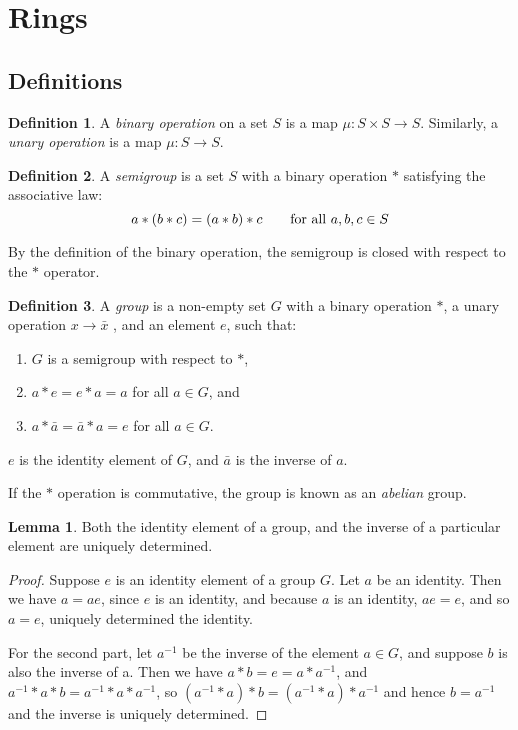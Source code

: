 \documentclass{article}
\theoremstyle{definition}
\newtheorem{definition}{Definition}[section]
\newtheorem{lemma}[theorem]{Lemma}
\begin{document}
\section{Rings}

\subsection{Definitions}

  \begin{definition}
    A \emph{binary operation} on a set $S$ is a map $\mu:S \times S \to S$.
    Similarly, a \emph{unary operation} is a map $\mu:S \to S$.
  \end{definition}

  \begin{definition}
    A \emph{semigroup} is a set $S$ with a binary operation $*$ satisfying
    the associative law:
    \[
      a * (b * c) = (a * b) * c \text{\qquad for all } a, b,c \in S
    \]

    By the definition of the binary operation, the semigroup is closed with
    respect to the $*$ operator.

  \end{definition}

  \begin{definition} A \emph{group} is a non-empty set $G$ with a binary
    operation $*$, a unary operation $x \to \bar{x}$ ,
    and an element $e$, such that:

    \begin{enumerate}
      \item $G$ is a semigroup with respect to $*$,
      \item $a * e = e * a = a$ for all $a \in G$, and
      \item $a * \bar{a} = \bar{a} * a = e$ for all $a \in G$.
    \end{enumerate}

    $e$ is the identity element of $G$, and $\bar{a}$ is the inverse of $a$.

    If the $*$ operation is commutative, the group is known as an
    \emph{abelian} group.

  \end{definition}

  \begin{lemma}
    Both the identity element of a group, and the inverse of a particular
    element are uniquely determined.
  \end{lemma}

  \begin{proof}
    Suppose $e$ is an identity element of a group $G$. Let $a$ be an identity.
    Then we have $a = ae$, since $e$ is an identity, and because $a$ is an
    identity, $ae = e$, and so $a = e$, uniquely determined the identity.

    For the second part, let $a^{-1}$ be the inverse of the element $a \in G$,
    and suppose $b$ is also the inverse of a. Then we have $a * b = e = a *
    a^{-1}$, and $ a^{-1} * a * b = a^{-1} * a * a^{-1} $, so $ (a^{-1} * a) *
    b = (a^{-1} * a) * a^{-1} $ and hence $b = a^{-1}$ and the inverse is
    uniquely determined.
  \end{proof}
\end{document}
